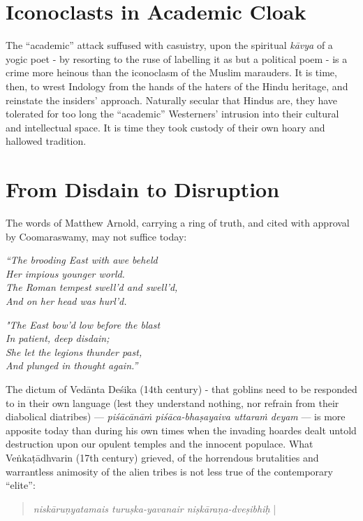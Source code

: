 \section*{Iconoclasts in Academic Cloak}

The “academic” attack suffused with casuistry, upon the spiritual {\sl kāvya} of a yogic poet - by resorting to the ruse of labelling it as but a political poem - is a crime more heinous than the iconoclasm of the Muslim marauders. It is time, then, to wrest Indology from the hands of the haters of the Hindu heritage, and reinstate the insiders’ approach. Naturally secular that Hindus are, they have  tolerated for too long the “academic” Westerners’ intrusion into their cultural and intellectual space. It is time they took custody of their own hoary and hallowed tradition. 

\section*{From Disdain to Disruption}

The words of Matthew Arnold, carrying a ring of truth, and cited with approval by Coomaraswamy, may not suffice today:

\begin{myquote}
{{\sl ``The brooding East with awe beheld}}\\
{\sl Her impious younger world.}\\
{\sl The Roman tempest swell'd and swell'd,}\\
{\sl And on her head was hurl'd.}
\end{myquote}


\begin{myquote}
{{\sl "The East bow'd low before the blast}}\\
{\sl In patient, deep disdain;}\\
{\sl She let the legions thunder past,}\\
{\sl And plunged in thought again.''}
\end{myquote}

The dictum of Vedānta Deśika (14th century) - that goblins need to be responded to in their own language (lest they understand nothing, nor refrain from their diabolical diatribes) --- {\sl piśācānāṁ piśāca-bhaṣayaiva uttaraṁ deyam} --- is more apposite today than during his own times when the invading hoardes dealt untold destruction upon our opulent temples and the innocent populace. What Veṅkaṭādhvarin (17th century) grieved, of the horrendous brutalities and warrantless animosity of the alien tribes is not less true of the contemporary ``elite'':
\begin{quote}
{{\sl niskāruṇyatamais turuṣka-yavanair niṣkāraṇa-dveṣibhiḥ}} |
\end{quote}

